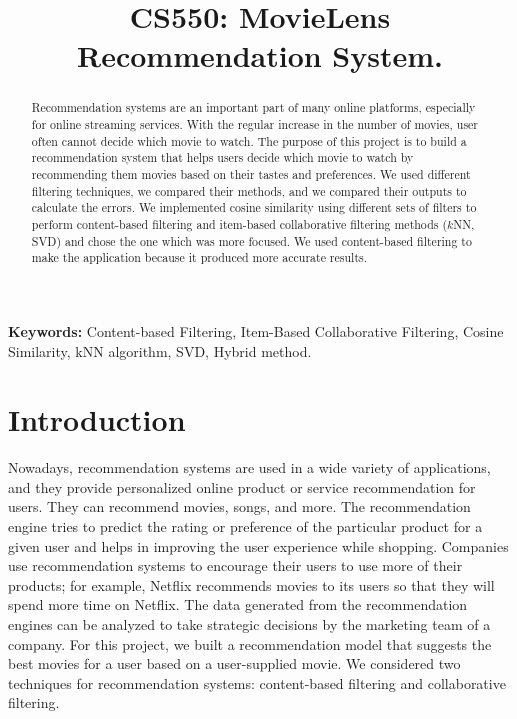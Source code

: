 \documentclass[10pt,conference]{IEEEtran}
\begin{document}
\title{CS550: MovieLens Recommendation System.}
\author{
\and
{}
\and
{}
 \and
{}
}

\maketitle
\begin{abstract}
Recommendation systems are an important part of many online platforms, especially for online streaming services.
With the regular increase in the number of movies, user often cannot decide which movie to watch.
The purpose of this project is to build a recommendation system that helps users decide which movie to watch by recommending them movies based on their tastes and preferences.
We used different filtering techniques, we compared their methods, and we compared their outputs to calculate the errors.
We implemented cosine similarity using different sets of filters to perform content-based filtering and item-based collaborative filtering methods ($k$NN, SVD) and chose the one which was more focused.
We used content-based filtering to make the application because it produced more accurate results.
\end{abstract}

\textnormal{ \textbf{Keywords:} Content-based Filtering, Item-Based Collaborative Filtering, Cosine Similarity, kNN algorithm, SVD, Hybrid method.
}

\IEEEpeerreviewmaketitle

\section{Introduction}\label{sec:1. Introduction}

Nowadays, recommendation systems are used in a wide variety of applications, and they provide personalized online product or service recommendation for users.
They can recommend movies, songs, and more.
The recommendation engine tries to predict the rating or preference of the particular product for a given user and helps in improving the user experience while shopping.
Companies use recommendation systems to encourage their users to use more of their products; for example, Netflix recommends movies to its users so that they will spend more time on Netflix.
The data generated from the recommendation engines can be analyzed to take strategic decisions by the marketing team of a company.
For this project, we built a recommendation model that suggests the best movies for a user based on a user-supplied movie.
We considered two techniques for recommendation systems: content-based filtering and collaborative filtering.
\end{document}
